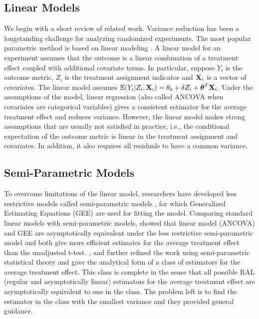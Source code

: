 \documentclass{sig-alternate}
\begin{document}
\subsection{Linear Models}\label{sec:literature}
We begin with a short review of related work. Variance reduction has been a longstanding challenge for analyzing randomized experiments. The most popular parametric method is based on linear modeling \citep{dagelman}. A linear model for an experiment assumes that the outcome is a linear combination of a treatment effect coupled with additional covariate terms. In particular, suppose $Y_i$ is the outcome metric,  $Z_i$ is the treatment assignment indicator and $\mathbf{X}_i$ is a vector of covariates. The linear model assumes $\mathbb{E} (Y_i|Z_i,\mathbf{X}_i) = \theta_0+\delta Z_i + \boldsymbol{\theta}^T \mathbf{X}_i$. Under the assumptions of the model, linear regression (also called ANCOVA when covariates are categorical variables) gives a consistent estimator for the average treatment effect and reduces variance. However, the linear model makes strong assumptions that are usually not satisfied in practice, i.e., the conditional expectation of the outcome metric is linear in the treatment assignment and covariates. In addition, it also requires all residuals to have a common variance. 

\subsection{Semi-Parametric Models}
To overcome limitations of the linear model, researchers have developed less restrictive models called semi-parametric models \citep{semipara}, for which Generalized Estimating Equations (GEE) are used for fitting the model. Comparing standard linear models with semi-parametric models, \citet{yangtsiatis} showed that linear model (ANCOVA) and GEE are asymptotically equivalent under the less restrictive semi-parametric model and both give more efficient estimates for the average treatment effect than the unadjusted t-test.  \citet{semiparapretest}, 
\citet{semiparamissing} and \citet{tsiatiscovariateadj} further refined the work using  semi-parametric statistical theory \citep{semipara} and gave the analytical form of a class of estimators for the average treatment effect. This class is complete in the sense that all possible RAL (regular and asymptotically linear) estimators for the average treatment effect are asymptotically equivalent to one in the class. The problem left is to find the estimator in the class with the smallest variance and they provided general guidance. 
\end{document}
